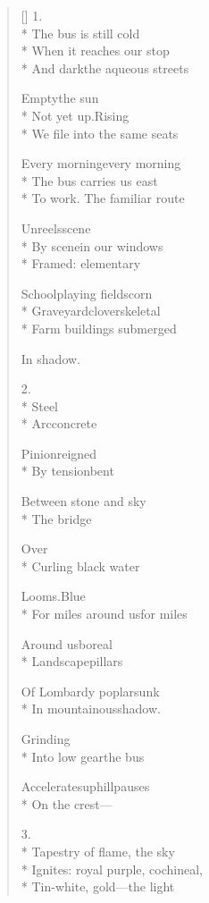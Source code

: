\label{ch:phoenix}
\settowidth{\versewidth}{And children, or the empty rooms where}
\begin{verse}[\versewidth]
1.\\*
The bus is still cold\\*
When it reaches our stop\\*
And dark\qquad the aqueous streets

Empty\qquad the sun\\*
Not yet up.\qquad Rising\\*
We file into the same seats

Every morning\qquad every morning\\*
The bus carries us east\\*
To work.    The familiar route

Unreels\quad scene\\*
By scene\quad in our windows\\*
Framed: elementary

School\quad playing fields\quad corn\\*
Graveyard\quad clover\quad skeletal\\*
Farm buildings submerged

In shadow.

2.\\*
\qquad \qquad \qquad Steel\\*
Arc\qquad \qquad concrete

Pinion\qquad reigned\\*
By tension\qquad bent

Between stone and sky\\*
The bridge

\qquad \qquad Over\\*
Curling black water

Looms.\qquad \qquad Blue\\*
For miles around us\qquad for miles

Around us\qquad boreal\\*
Landscape\qquad pillars

Of Lombardy poplar\qquad sunk\\*
In mountainous\qquad shadow.

\qquad \qquad Grinding\\*
Into low gear\qquad the bus

Accelerates\qquad uphill\qquad pauses\\*
On the crest---

3.\\*
Tapestry of flame, the sky\\*
Ignites: royal purple, cochineal,\\*
Tin-white, gold---the light


\end{verse}
